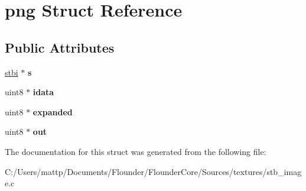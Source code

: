 \hypertarget{structpng}{}\section{png Struct Reference}
\label{structpng}
\subsection*{Public Attributes}
\begin{DoxyCompactItemize}
\item 
\mbox{\label{structpng_a77d3bfd0ae8f598a475317ed39e78fd0}} 
\hyperlink{structstbi}{stbi} $\ast$ {\bfseries s}
\item 
\mbox{\label{structpng_a5cd944fdf0f0417a344bcc538ed98ed6}} 
uint8 $\ast$ {\bfseries idata}
\item 
\mbox{\label{structpng_a474dd0da8ac0347924e68f5de7e68c55}} 
uint8 $\ast$ {\bfseries expanded}
\item 
\mbox{\label{structpng_ada33c39620ad9a647c088c40d21887f6}} 
uint8 $\ast$ {\bfseries out}
\end{DoxyCompactItemize}


The documentation for this struct was generated from the following file\+:\begin{DoxyCompactItemize}
\item 
C\+:/\+Users/mattp/\+Documents/\+Flounder/\+Flounder\+Core/\+Sources/textures/stb\+\_\+image.\+c\end{DoxyCompactItemize}
